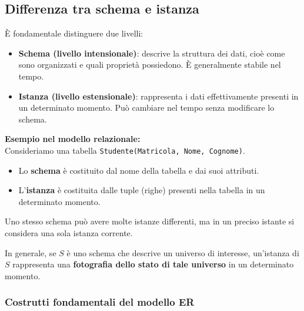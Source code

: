 \subsection{Differenza tra schema e istanza}

È fondamentale distinguere due livelli:
\begin{itemize}
    \item \textbf{Schema (livello intensionale)}: descrive la struttura dei dati, cioè come sono organizzati e quali proprietà possiedono. È generalmente stabile nel tempo.
    \item \textbf{Istanza (livello estensionale)}: rappresenta i dati effettivamente presenti in un determinato momento. Può cambiare nel tempo senza modificare lo schema.
\end{itemize}
\noindent \textbf{Esempio nel modello relazionale:}\\
Consideriamo una tabella \texttt{Studente(Matricola, Nome, Cognome)}.
\begin{itemize}
    \item Lo \textbf{schema} è costituito dal nome della tabella e dai suoi attributi.
    \item L'\textbf{istanza} è costituita dalle tuple (righe) presenti nella tabella in un determinato momento.
\end{itemize}
\noindent Uno stesso schema può avere molte istanze differenti, ma in un preciso istante si considera una sola istanza corrente.\medskip\\
\colorbox{SALZO}{\parbox{\dimexpr\linewidth-2\fboxsep}{
In generale, se $S$ è uno schema che descrive un universo di interesse, un'istanza di $S$ rappresenta una \textbf{fotografia dello stato di tale universo} in un determinato momento.   
}}

\subsubsection{Costrutti fondamentali del modello ER}

